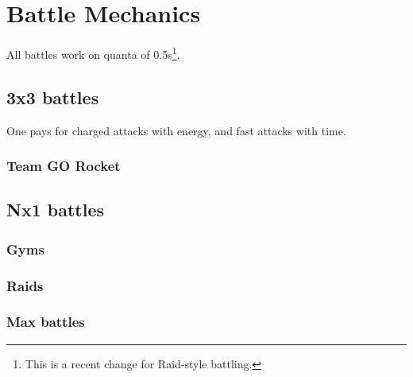 \chapter{Battle Mechanics}
\label{chap:battle}
All battles work on quanta of 0.5s\footnote{This is a recent change for Raid-style battling.}.

\section{3x3 battles}
\label{section:3x3}
One pays for charged attacks with energy, and fast attacks with time.

\subsection{Team GO Rocket}
\label{section:rocket}

\section{Nx1 battles}
\label{section:nx1}

\subsection{Gyms}
\label{section:gyms}

\subsection{Raids}
\label{section:raids}

\subsection{Max battles}
\label{section:maxbattles}
